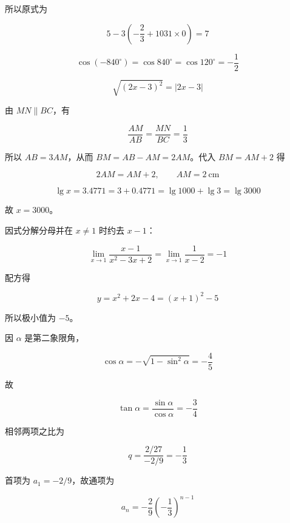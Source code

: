 \begin{answer}
所以原式为

\nopagebreak[4]
\[
5-3\left(-\frac23+1031\times0\right)=7
\]


\nopagebreak[4]
\[
\cos(-840^\circ)=\cos840^\circ=\cos120^\circ=-\frac12
\]


\nopagebreak[4]
\[
\sqrt{(2x-3)^2}=\lvert2x-3\rvert
\]


由 $MN\parallel BC$，有

\nopagebreak[4]
\[
\frac{AM}{AB}=\frac{MN}{BC}=\frac13
\]

所以 $AB=3AM$，从而 $BM=AB-AM=2AM$。代入 $BM=AM+2$ 得

\nopagebreak[4]
\[
2AM=AM+2,
\qquad AM=2\ \mathrm{cm}
\]


\nopagebreak[4]
\[
\lg x=3.4771=3+0.4771=\lg1000+\lg3=\lg3000
\]

故 $x=3000$。


因式分解分母并在 $x\ne1$ 时约去 $x-1$：

\nopagebreak[4]
\[
\lim_{x\to1}\frac{x-1}{x^2-3x+2}
=\lim_{x\to1}\frac1{x-2}=-1
\]


配方得

\nopagebreak[4]
\[
y=x^2+2x-4=(x+1)^2-5
\]

所以极小值为 $-5$。


因 $\alpha$ 是第二象限角，

\nopagebreak[4]
\[
\cos\alpha=-\sqrt{1-\sin^2\alpha}=-\frac45
\]

故

\nopagebreak[4]
\[
\tan\alpha=\frac{\sin\alpha}{\cos\alpha}=-\frac34
\]


相邻两项之比为

\nopagebreak[4]
\[
q=\frac{2/27}{-2/9}=-\frac13
\]

首项为 $a_1=-2/9$，故通项为

\nopagebreak[4]
\[
a_n=-\frac29\left(-\frac13\right)^{n-1}
\]


\end{answer}

